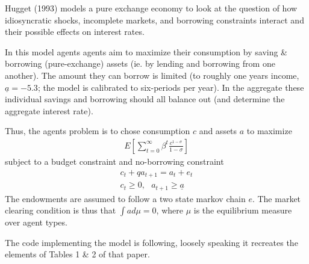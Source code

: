 %
 
Hugget (1993) models a pure exchange economy to look at the question of how idiosyncratic shocks, incomplete markets, 
and borrowing constraints interact and their possible effects on interest rates.

In this model agents agents aim to maximize their consumption by saving \& borrowing (pure-exchange) assets (ie. by lending
and borrowing from one another). The amount they can borrow is limited (to roughly one years income, $\underline{a}=-5.3$; the
model is calibrated to six-periods per year). In the aggregate these individual savings and borrowing should all balance out (and
determine the aggregate interest rate).

Thus, the agents problem is to chose consumption $c$ and assets $a$ to maximize
\begin{align*}
 E[\sum_{t=0}^{\infty} \beta^t \frac{c^{1-\sigma}}{1-\sigma}]
\end{align*}
subject to a budget constraint and no-borrowing constraint
\begin{align*}
 c_t+q a_{t+1}=a_t+e_t \\
 c_t \geq 0, \text{ } a_{t+1} \geq \underline{a}
\end{align*}
The endowments are assumed to follow a two state markov chain $e$. 
The market clearing condition is thus that $\int a d\mu= 0$, where $\mu$ is the equilibrium measure over agent types.

The code implementing the model is following, loosely speaking it recreates the elements of Tables 1 \& 2 of that paper.




%